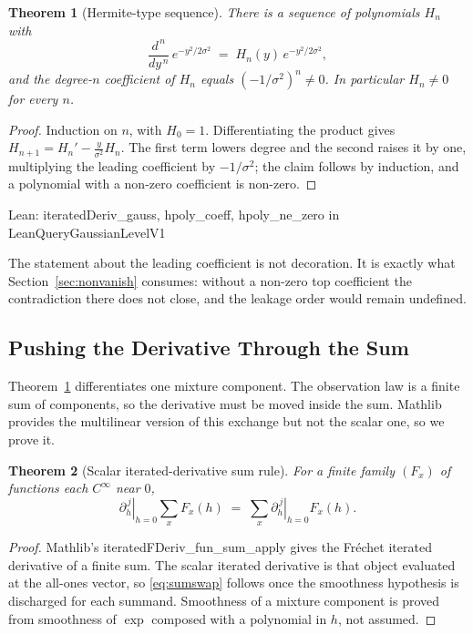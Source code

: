 \documentclass[conference]{IEEEtran}
\newtheorem{theorem}{Theorem}
\theoremstyle{definition}
\newcommand{\lean}[1]{\textsf{\footnotesize #1}}
\newcommand{\leanbox}[1]{%
  \par\vspace{2pt}\noindent
  {\footnotesize\textsf{Lean: #1}}\par\vspace{2pt}}
\begin{document}
\begin{theorem}[Hermite-type sequence]
\label{thm:hermite}
There is a sequence of polynomials $H_{n}$ with
\begin{equation}
\frac{d^{\,n}}{dy^{\,n}}\,e^{-y^{2}/2\sigma^{2}}
   \;=\;H_{n}(y)\,e^{-y^{2}/2\sigma^{2}},
\label{eq:hermite}
\end{equation}
and the degree-$n$ coefficient of $H_{n}$ equals $(-1/\sigma^{2})^{n}\neq0$. In particular
$H_{n}\neq0$ for every $n$.
\end{theorem}

\begin{proof}
Induction on $n$, with $H_{0}=1$. Differentiating the product gives
$H_{n+1}=H_{n}'-\tfrac{y}{\sigma^{2}}H_{n}$. The first term lowers degree and the second
raises it by one, multiplying the leading coefficient by $-1/\sigma^{2}$; the claim follows
by induction, and a polynomial with a non-zero coefficient is non-zero.
\end{proof}

\leanbox{\lean{iteratedDeriv\_gauss}, \lean{hpoly\_coeff}, \lean{hpoly\_ne\_zero} in
\lean{LeanQueryGaussianLevelV1}}

The statement about the leading coefficient is not decoration. It is exactly what
Section~\ref{sec:nonvanish} consumes: without a non-zero top coefficient the contradiction
there does not close, and the leakage order would remain undefined.

\subsection{Pushing the Derivative Through the Sum}
\label{sec:assembly}

Theorem~\ref{thm:hermite} differentiates one mixture component. The observation law is a
finite sum of components, so the derivative must be moved inside the sum. Mathlib provides
the multilinear version of this exchange but not the scalar one, so we prove it.

\begin{theorem}[Scalar iterated-derivative sum rule]
\label{thm:sumswap}
For a finite family $(F_{x})$ of functions each $C^{\infty}$ near $0$,
\begin{equation}
\left.\partial_{h}^{\,j}\right|_{h=0}\sum_{x}F_{x}(h)
   \;=\;\sum_{x}\left.\partial_{h}^{\,j}\right|_{h=0}F_{x}(h).
\label{eq:sumswap}
\end{equation}
\end{theorem}

\begin{proof}
Mathlib's \lean{iteratedFDeriv\_fun\_sum\_apply} gives the Fréchet iterated derivative of a
finite sum. The scalar iterated derivative is that object evaluated at the all-ones vector,
so \eqref{eq:sumswap} follows once the smoothness hypothesis is discharged for each summand.
Smoothness of a mixture component is proved from smoothness of $\exp$ composed with a
polynomial in $h$, not assumed.
\end{proof}
\end{document}
